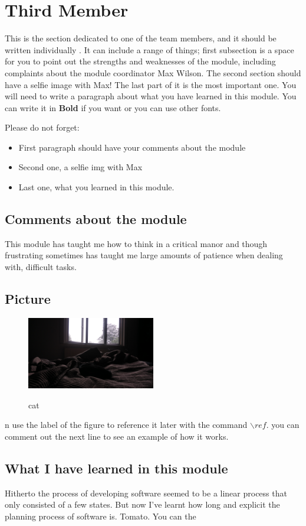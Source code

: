 \section{Third Member}
This is the section dedicated to one of the team members, and it should be written individually . It can include a range of things; first subsection is a space for you to point out the strengths and weaknesses of the module, including complaints about the module coordinator Max Wilson. The second section should have a selfie image with Max! The last part of it is the most important one. You will need to write a paragraph about what you have learned in this module. You can write it in \textbf{Bold} if you want or you can use other fonts. 

Please do not forget:
\begin{itemize}
	\item First paragraph should have your comments about the module
	\item Second one, a selfie img with Max
	\item Last one, what you learned in this module.
\end{itemize}

\subsection{Comments about the module}
This module has taught me how to think in a critical manor and though frustrating sometimes has taught me large amounts of patience when dealing with, difficult tasks. 

\subsection{Picture}



\begin{figure}[h]
\caption{cat}
\centering
\includegraphics[width=0.5\textwidth]{cat}
\label{fig:pic of cat}
\end{figure}
n use the label of the figure to reference it later with the command ${\backslash}ref$. you can comment out the next line to see an example of how it works.


\subsection{What I have learned in this module}
Hitherto the process of developing software seemed to be a linear process that only consisted of a few states. But now I've learnt how long and explicit the planning process of software is. Tomato.  
You can the